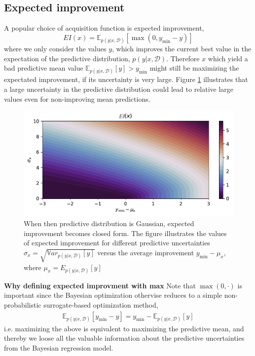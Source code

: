 \subsection{Expected improvement}
A popular choice of acquisition function is expected improvement, 
$$EI(x) = \mathbb{E}_{p(y|x,\mathcal{D})}[\max(0, y_{\min}-y)]$$ where we only consider the values
$y$, which improves the current best value in the expectation of the predictive distribution,
$p(y|x,\mathcal{D})$. Therefore $x$ which yield a bad predictive mean value
$\mathbb{E}_{p(y|x,\mathcal{D})}[y]> y_{\min}$ might still be maximizing the expectated improvement,
if its uncertainty is very large. Figure \ref{EI_illustration} illustrates that a large uncertainty
in the predictive distribution could lead to relative large values even for non-improving mean
predictions.

\begin{figure}%
    \centering
    \includegraphics[width=\textwidth]{Pictures/expected_improvement_illustration.pdf}
    \caption{When then predictive distribution is Gaussian, expected improvement becomes closed
    form. The figure illustrates the values of expected improvement for different predictive
    uncertainties $\sigma_x = \sqrt{\mathbb{V}ar_{p(y|x,\mathcal{D})}[y]}$ versus the average
    improvement $y_{\min}-\mu_x$, where $\mu_x = E_{p(y|x,\mathcal{D})}[y]$}
    \label{EI_illustration}
\end{figure}


\begin{note}
    \textbf{Why defining expected improvment with max}    
    Note that $\max(0,\cdot)$ is important since the Bayesian optimization othervise reduces to
    a simple non-probabilistic surrogate-based optimization method,
    \begin{align*}
        \mathbb{E}_{p(y|x,\mathcal{D})}[y_{\min}-y] = y_{\min} - \mathbb{E}_{p(y|x,\mathcal{D})}[y]
    \end{align*}
    i.e. maximizing the above is equivalent to maximizing the predictive mean, and thereby we loose
    all the valuable information about the predictive uncertainties from the Bayesian regression model. 
\end{note}

